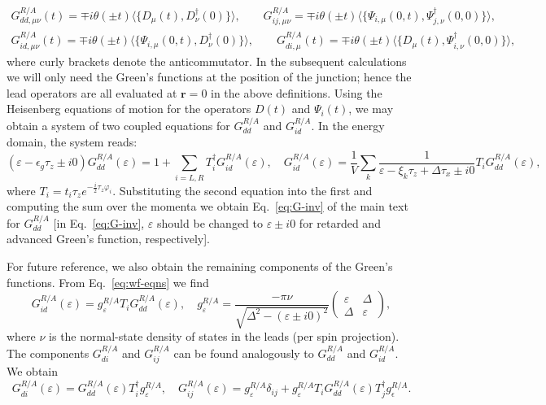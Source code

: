 \documentclass[aps,reprint,longbibliography, prb]{revtex4-2}
\begin{document}
\begin{gather}
    G_{dd,\mu\nu}^{R/A}(t) = \mp i\theta(\pm t)\langle\{D_\mu(t), D_\nu^\dagger(0)\}\rangle,\quad\quad G_{ij,\mu\nu}^{R/A} = \mp i\theta(\pm t)\langle\{\Psi_{i,\mu}(0,t), \Psi_{j,\nu}^\dagger(0,0)\}\rangle,\\
    G_{id,\mu\nu}^{R/A}(t) = \mp i\theta(\pm t)\langle\{\Psi_{i,\mu}(0,t), D_\nu^\dagger(0)\}\rangle,\quad\quad G_{di,\mu}^{R/A}(t) = \mp i\theta(\pm t)\langle\{D_{
    \mu}(t), \Psi_{i,\nu}^\dagger(0,0)\}\rangle,
\end{gather}
where curly brackets denote the anticommutator. In the subsequent calculations we will only need the Green's functions at the position of the junction; hence the lead operators are all evaluated at $\mathbf{r} = 0$ in the above definitions. Using the Heisenberg equations of motion for the operators $D(t)$ and $\Psi_i(t)$, we may obtain a system of two coupled equations for $G_{dd}^{R/A}$ and $G_{id}^{R/A}$. In the energy domain, the system reads:
\begin{equation}
\label{eq:wf-eqns}
    (\varepsilon - \epsilon_g \tau_z \pm i0)G^{R/A}_{dd}(\varepsilon) = 1 + \sum_{i = L,R} T_i^\dagger G_{id}^{R/A}(\varepsilon),\quad  G_{id}^{R/A}(\varepsilon) = \frac{1}{V}\sum_k \frac{1}{\varepsilon - \xi_k\tau_z + \Delta\tau_x \pm i0}T_i G_{dd}^{R/A}(\varepsilon),
\end{equation}
where $T_i = t_i \tau_z e^{-\frac{i}{2}\tau_z \varphi_i}$. Substituting the second equation into the first and computing the sum over the momenta we obtain Eq.~\eqref{eq:G-inv} of the main text for $G_{dd}^{R/A}$ [in Eq.~\eqref{eq:G-inv}, $\varepsilon$ should be changed to $\varepsilon\pm i0$ for retarded and advanced Green's function, respectively].

For future reference, we also obtain the remaining components of the Green's functions. From Eq.~\eqref{eq:wf-eqns} we find
\begin{equation}\label{eq:id_app}
    G_{id}^{R/A}(\varepsilon) = g^{R/A}_\varepsilon T_i G^{R/A}_{dd}(\varepsilon),\quad g^{R/A}_\varepsilon = \frac{-\pi\nu}{\sqrt{\Delta^2 - (\varepsilon \pm i0)^2}}
    \begin{pmatrix}
    \varepsilon & \Delta \\
    \Delta & \varepsilon
    \end{pmatrix},
\end{equation}
where $\nu$ is the normal-state density of states in the leads (per spin projection). The components $G_{di}^{R/A}$ and $G_{ij}^{R/A}$ can be found analogously to $G_{dd}^{R/A}$ and $G_{id}^{R/A}$. We obtain
\begin{equation}
    \label{eq:exact-greens}
    G_{di}^{R/A}(\varepsilon) =   G^{R/A}_{dd}(\varepsilon) T_i^\dagger g^{R/A}_\varepsilon,\quad   G_{ij}^{R/A}(\varepsilon) = g^{R/A}_\varepsilon \delta_{ij} + g^{R/A}_\varepsilon T_i G^{R/A}_{dd}(\varepsilon) T_j^\dagger g^{R/A}_\epsilon.
\end{equation}
\end{document}
